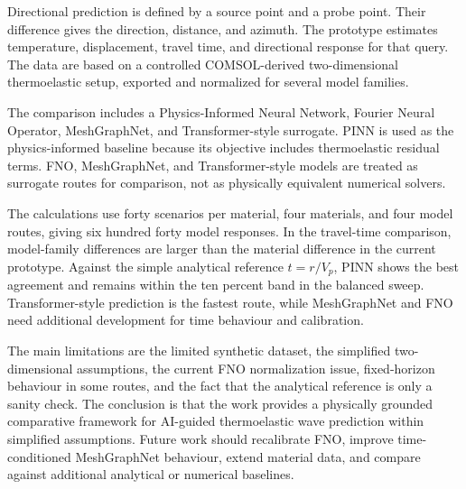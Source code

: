 \documentclass[11pt,a4paper]{article}
\begin{document}
Directional prediction is defined by a source point and a probe point. Their difference gives the direction, distance, and azimuth. The prototype estimates temperature, displacement, travel time, and directional response for that query. The data are based on a controlled COMSOL-derived two-dimensional thermoelastic setup, exported and normalized for several model families.

The comparison includes a Physics-Informed Neural Network, Fourier Neural Operator, MeshGraphNet, and Transformer-style surrogate. PINN is used as the physics-informed baseline because its objective includes thermoelastic residual terms. FNO, MeshGraphNet, and Transformer-style models are treated as surrogate routes for comparison, not as physically equivalent numerical solvers.

The calculations use forty scenarios per material, four materials, and four model routes, giving six hundred forty model responses. In the travel-time comparison, model-family differences are larger than the material difference in the current prototype. Against the simple analytical reference $t=r/V_p$, PINN shows the best agreement and remains within the ten percent band in the balanced sweep. Transformer-style prediction is the fastest route, while MeshGraphNet and FNO need additional development for time behaviour and calibration.

The main limitations are the limited synthetic dataset, the simplified two-dimensional assumptions, the current FNO normalization issue, fixed-horizon behaviour in some routes, and the fact that the analytical reference is only a sanity check. The conclusion is that the work provides a physically grounded comparative framework for AI-guided thermoelastic wave prediction within simplified assumptions. Future work should recalibrate FNO, improve time-conditioned MeshGraphNet behaviour, extend material data, and compare against additional analytical or numerical baselines.
\end{document}
